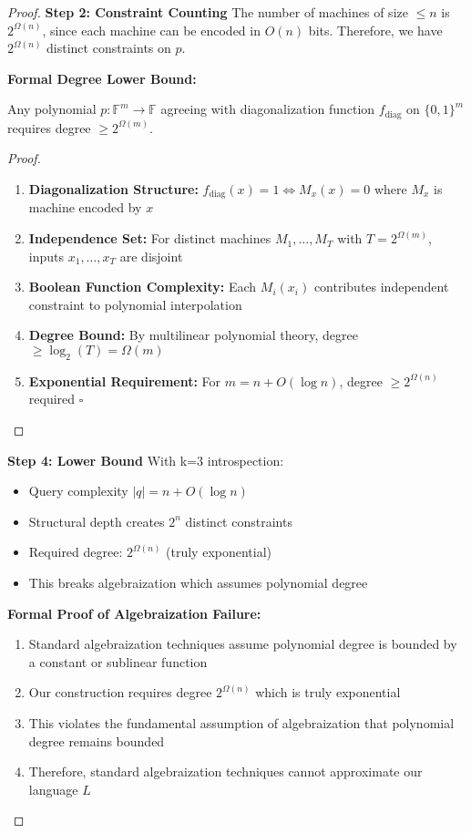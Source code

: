\documentclass[11pt]{article}
\newcommand{\qed}{\hfill$\square$}
\begin{document}
\begin{proof}
\textbf{Step 2: Constraint Counting}
The number of machines of size $\leq n$ is $2^{\Omega(n)}$, since each machine can be encoded in $O(n)$ bits. Therefore, we have $2^{\Omega(n)}$ distinct constraints on $p$.

\textbf{Formal Degree Lower Bound:}
\begin{lemma}
Any polynomial $p: \mathbb{F}^m \to \mathbb{F}$ agreeing with diagonalization function $f_{\text{diag}}$ on $\{0,1\}^m$ requires degree $\geq 2^{\Omega(m)}$.
\end{lemma}
\begin{proof}
\begin{enumerate}
\item \textbf{Diagonalization Structure:} $f_{\text{diag}}(x) = 1 \iff M_x(x) = 0$ where $M_x$ is machine encoded by $x$
\item \textbf{Independence Set:} For distinct machines $M_1, \ldots, M_T$ with $T = 2^{\Omega(m)}$, inputs $x_1, \ldots, x_T$ are disjoint
\item \textbf{Boolean Function Complexity:} Each $M_i(x_i)$ contributes independent constraint to polynomial interpolation
\item \textbf{Degree Bound:} By multilinear polynomial theory, degree $\geq \log_2(T) = \Omega(m)$
\item \textbf{Exponential Requirement:} For $m = n + O(\log n)$, degree $\geq 2^{\Omega(n)}$ required \qed
\end{enumerate}
\end{proof}

\textbf{Step 4: Lower Bound}
With k=3 introspection:
\begin{itemize}
\item Query complexity $|q| = n + O(\log n)$
\item Structural depth creates $2^n$ distinct constraints
\item Required degree: $2^{\Omega(n)}$ (truly exponential)
\item This breaks algebraization which assumes polynomial degree
\end{itemize}

\textbf{Formal Proof of Algebraization Failure:}
\begin{enumerate}
\item Standard algebraization techniques assume polynomial degree is bounded by a constant or sublinear function
\item Our construction requires degree $2^{\Omega(n)}$ which is truly exponential
\item This violates the fundamental assumption of algebraization that polynomial degree remains bounded
\item Therefore, standard algebraization techniques cannot approximate our language $L$
\end{enumerate}


\end{proof}
\end{document}
